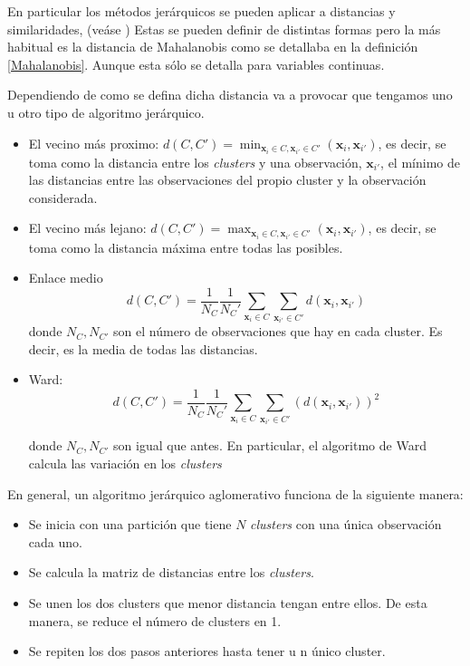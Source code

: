 \noindent En particular los métodos jerárquicos se pueden aplicar a distancias y similaridades, (veáse \cite{Mardia 1979}) Estas se pueden definir de distintas formas pero la más habitual es la distancia de Mahalanobis como se detallaba en la definición \ref{Mahalanobis}. Aunque esta sólo se detalla para variables continuas. 

\noindent Dependiendo de como se defina dicha distancia va a provocar que tengamos uno u otro tipo de algoritmo jerárquico.\cite{Everitt 2011, Johnson 2007, Peña 2002}
\begin{itemize}
\item El vecino más proximo: $d(C,C')=\min_{\mathbf{x}_i\in C, \mathbf{x}_{i'}\in C'}(\mathbf{x}_i,\mathbf{x}_{i'})$, es decir, se toma como la distancia entre los \emph{clusters} y una observación, $\mathbf{x}_{i'}$, el mínimo de las distancias entre las observaciones del propio cluster y la observación considerada.
\item El vecino más lejano: $d(C,C')=\max_{\mathbf{x}_i\in C, \mathbf{x}_{i'}\in C'}(\mathbf{x}_i,\mathbf{x}_{i'})$, es decir, se toma como la distancia máxima entre todas las posibles. 
\item Enlace medio \begin{equation}
d(C,C')=\dfrac{1}{N_C}\dfrac{1}{N_C'}\sum_{\mathbf{x}_i\in C}\sum_{\mathbf{x}_{i'}\in C'} d(\mathbf{x}_i, \mathbf{x}_{i'})
\end{equation}
donde $N_C, N_{C'}$ son el número de observaciones que hay en cada cluster. Es decir, es la media de todas las distancias. 
\item Ward:
\begin{equation}
d(C,C')=\dfrac{1}{N_C}\dfrac{1}{N_C'}\sum_{\mathbf{x}_i\in C}\sum_{\mathbf{x}_{i'}\in C'} (d(\mathbf{x}_i, \mathbf{x}_{i'}))^2
\end{equation} 

donde $N_C, N_{C'}$ son igual que antes. En particular, el algoritmo de Ward calcula las variación en los \emph{clusters}
\end{itemize}

\noindent En general, un algoritmo jerárquico aglomerativo funciona de la siguiente manera:

\begin{itemize}
\item Se inicia con una partición que tiene $N$ \emph{clusters} con una única observación cada uno.
\item Se calcula la matriz de distancias entre los \emph{clusters}. 
\item Se unen los dos clusters que menor distancia tengan entre ellos. De esta manera, se reduce el número de clusters en 1.  
\item Se repiten los dos pasos anteriores hasta tener u
n único cluster. 
\end{itemize}

